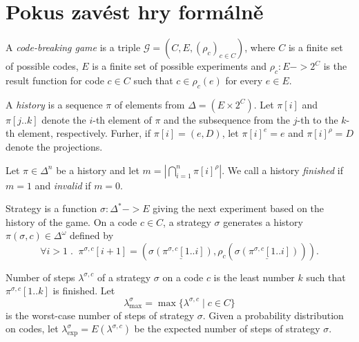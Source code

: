 \chapter{Pokus zavést hry formálně}

\newcommand{\game}{\mathcal{G}}

\newcommand{\Exp}{E}
\renewcommand{\exp}{e}
\newcommand{\Code}{C}
\newcommand{\Codeset}{D}
\newcommand{\code}{c}


\newcommand{\result}{\rho}
\newcommand{\resultc}{\result_\code}

\newcommand{\Expres}{\Delta}
\newcommand{\hist}{\pi}
\newcommand{\histstg}[2]{\hist^{#1,#2}}

\newcommand{\stg}{\sigma}
\newcommand{\len}{\lambda}
\newcommand{\lenstg}[2]{\len^{#1,#2}}
\newcommand{\lenmax}[1]{\len^{#1}_\textrm{max}}
\newcommand{\lenexp}[1]{\len^{#1}_\textrm{exp}}

\begin{definition}
A \emph{code-breaking game} is a triple 
 $\game = (\Code, \Exp, (\resultc)_{\code\in\Code})$, where 
 $\Code$ is a finite set of possible codes, 
 $\Exp$ is a finite set of possible experiments and
 $\resultc: \Exp -> 2^\Code$ is the result function for code $\code\in\Code$ such that
 $\code\in\resultc(\exp)$ for every $\exp\in\Exp$.
\end{definition}

\begin{definition}
A \emph{history} is a sequence $\hist$
 of elements from $\Expres = (\Exp \times 2^\Code)$.
Let $\hist[i]$ and $\hist[j..k]$ denote 
 the $i$-th element of $\hist$ and
 the subsequence from the $j$-th to the $k$-th element, respectively. 
 Furher, if $\hist[i] = (\exp, \Codeset)$, 
 let $\hist[i]^\exp = \exp$ and 
 $\hist[i]^\result = \Codeset$ denote the projections.

Let $\hist \in \Expres^n$ be a history and let 
 $m = \left|\bigcap_{i=1}^n\hist[i]^\result\right|$.
 We call a history \emph{finished} if $m = 1$ and \emph{invalid} if $m = 0$.
\end{definition}

\begin{definition}
Strategy is a function $\stg: \Expres^* -> \Exp$
 giving the next experiment based on the history of the game.
On a code $\code\in\Code$, a strategy $\stg$ generates a history $\hist(\stg, \code) \in\Expres^\omega$ defined by
 \[ \forall i>1\;.\;\;
 \histstg{\stg}{\code}[i+1] = 
 \left( \underline{\stg(\histstg{\stg}{\code}[1..i])},
 \resultc(\underline{\stg(\histstg{\stg}{\code}[1..i])}) \right). \]
\end{definition}

\begin{definition}
Number of steps $\lenstg{\stg}{\code}$ of a strategy $\stg$ on a code $\code$ 
 is the least number $k$ such that $\histstg{\stg}{\code}[1..k]$ is finished.
Let \[ \lenmax{\stg} = \max \{\lenstg{\stg}{\code} \;|\; \code\in\Code \} \] 
 is the worst-case number of steps of strategy $\stg$.
Given a probability distribution on codes,
 let $\lenexp{\stg} = E(\lenstg{\stg}{\code})$ be the expected number of steps of strategy $\stg$. 
\end{definition}

